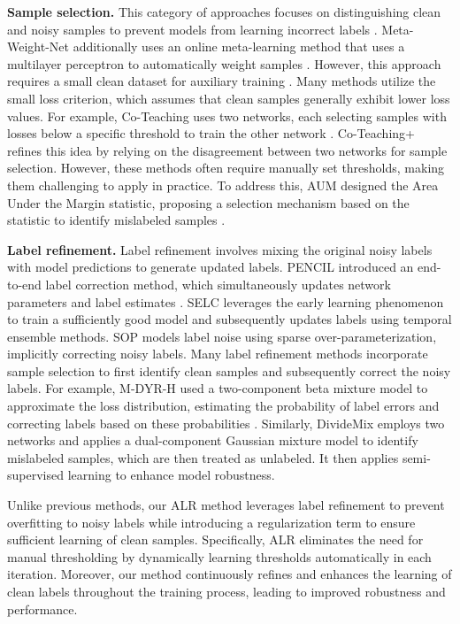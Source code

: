 \textbf{Sample selection.} This category of approaches focuses on distinguishing clean and noisy samples to prevent models from learning incorrect labels \citep{jiang2018mentornet, gui2021towards}. Meta-Weight-Net additionally uses an online meta-learning method that uses a multilayer perceptron to automatically weight samples \citep{shu2019meta}. However, this approach requires a small clean dataset for auxiliary training \citep{shu2019meta}. Many methods utilize the small loss criterion, which assumes that clean samples generally exhibit lower loss values. For example, Co-Teaching uses two networks, each selecting samples with losses below a specific threshold to train the other network \citep{han2018co}. Co-Teaching+ \citep{yu2019does} refines this idea by relying on the disagreement between two networks for sample selection. However, these methods often require manually set thresholds, making them challenging to apply in practice. To address this, AUM designed the Area Under the Margin statistic, proposing a selection mechanism based on the statistic to identify mislabeled samples \citep{pleiss2020identifying}. 

\textbf{Label refinement.} Label refinement involves mixing the original noisy labels with model predictions to generate updated labels. PENCIL introduced an end-to-end label correction method, which simultaneously updates network parameters and label estimates \citep{yi2019probabilistic}. SELC \citep{lu2022selc} leverages the early learning phenomenon to train a sufficiently good model and subsequently updates labels using temporal ensemble methods. SOP \citep{liu2022robust} models label noise using sparse over-parameterization, implicitly correcting noisy labels. Many label refinement methods incorporate sample selection to first identify clean samples and subsequently correct the noisy labels. For example, M-DYR-H used a two-component beta mixture model to approximate the loss distribution, estimating the probability of label errors and correcting labels based on these probabilities \citep{arazo2019unsupervised}. Similarly, DivideMix \citep{li2020dividemix} employs two networks and applies a dual-component Gaussian mixture model to identify mislabeled samples, which are then treated as unlabeled. It then applies semi-supervised learning \citep{yao2023better} to enhance model robustness.

Unlike previous methods, our ALR method leverages label refinement to prevent overfitting to noisy labels while introducing a regularization term to ensure sufficient learning of clean samples. Specifically, ALR eliminates the need for manual thresholding by dynamically learning thresholds automatically in each iteration. Moreover, our method continuously refines and enhances the learning of clean labels throughout the training process, leading to improved robustness and performance.